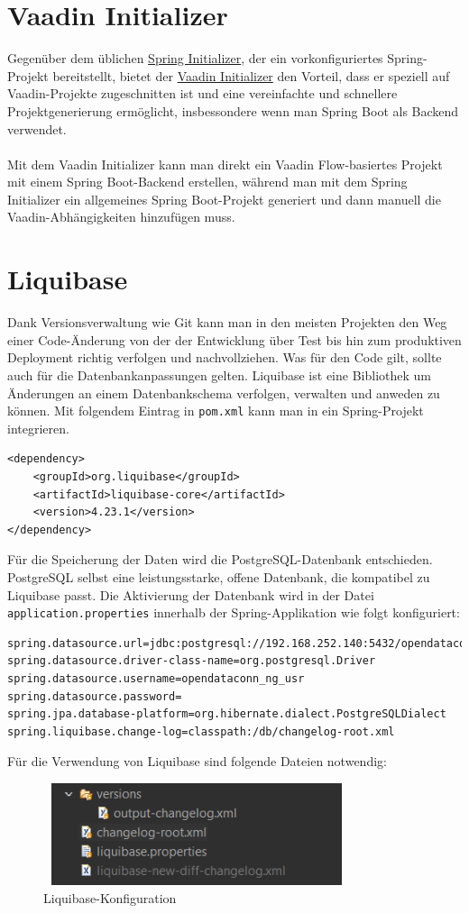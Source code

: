 \documentclass[a4paper,12pt]{scrreprt}
\begin{document}
\section{Vaadin Initializer}
Gegenüber dem üblichen \href{https://start.spring.io/} {Spring Initializer}, der ein vorkonfiguriertes Spring-Projekt bereitstellt, bietet der \href{https://start.vaadin.com/app/p} {Vaadin Initializer} den Vorteil, dass er speziell auf Vaadin-Projekte zugeschnitten ist und eine vereinfachte und schnellere Projektgenerierung ermöglicht, insbessondere wenn man Spring Boot als Backend verwendet.\\ \\ Mit dem Vaadin Initializer kann man direkt ein Vaadin Flow-basiertes Projekt mit einem Spring Boot-Backend erstellen, während man mit dem Spring Initializer ein allgemeines Spring Boot-Projekt generiert und dann manuell die Vaadin-Abhängigkeiten hinzufügen muss.

\section{Liquibase}
Dank Versionsverwaltung wie Git kann man in den meisten Projekten den Weg einer Code-Änderung von der der Entwicklung über Test bis hin zum produktiven Deployment richtig verfolgen und nachvollziehen. Was für den Code gilt, sollte auch für die Datenbankanpassungen gelten. Liquibase ist eine Bibliothek um Änderungen an einem Datenbankschema verfolgen, verwalten und anweden zu können. Mit folgendem Eintrag in \texttt{pom.xml} kann man in ein Spring-Projekt integrieren.
\begin{lstlisting}[language=POM]
<dependency>
    <groupId>org.liquibase</groupId>
    <artifactId>liquibase-core</artifactId>
    <version>4.23.1</version>
</dependency>
\end{lstlisting}
Für die Speicherung der Daten wird die PostgreSQL-Datenbank entschieden. PostgreSQL selbst eine leistungsstarke, offene Datenbank, die kompatibel zu Liquibase passt. Die Aktivierung der Datenbank wird in der Datei \texttt{application.properties} innerhalb der Spring-Applikation wie folgt konfiguriert:
\begin{lstlisting}[language=properties]
spring.datasource.url=jdbc:postgresql://192.168.252.140:5432/opendataconn_ng
spring.datasource.driver-class-name=org.postgresql.Driver
spring.datasource.username=opendataconn_ng_usr
spring.datasource.password=
spring.jpa.database-platform=org.hibernate.dialect.PostgreSQLDialect
spring.liquibase.change-log=classpath:/db/changelog-root.xml
\end{lstlisting}
Für die Verwendung von Liquibase sind folgende Dateien notwendig:
\begin{figure}[h!]
\centering
\includegraphics[width=9cm, height=3cm]{liquibase-changelog.png}
\caption{\label{datenbank:konfiguration} Liquibase-Konfiguration}
\end{figure}
\end{document}
